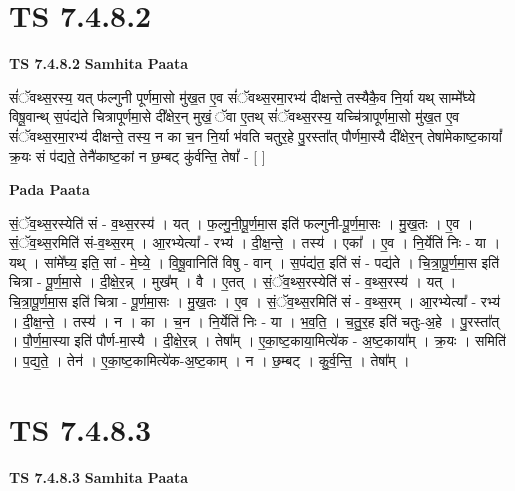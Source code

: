 \documentclass[17pt]{extarticle}
\begin{document}
\section*{ TS 7.4.8.2 }

\textbf{TS 7.4.8.2 } \newline
\textbf{Samhita Paata} \newline

सं॑ॅवथ्स॒रस्य॒ यत् फ॑ल्गुनी पूर्णमा॒सो मु॑ख॒त ए॒व सं॑ॅवथ्स॒रमा॒रभ्य॑ दीक्षन्ते॒ तस्यैकै॒व नि॒र्या यथ् साम्मे᳚घ्ये विषू॒वान्थ् स॒पंद्य॑ते चित्रापूर्णमा॒से दी᳚क्षेर॒न् मुखं॒ ॅवा ए॒तथ् सं॑ॅवथ्स॒रस्य॒ यच्चि॑त्रापूर्णमा॒सो मु॑ख॒त ए॒व सं॑ॅवथ्स॒रमा॒रभ्य॑ दीक्षन्ते॒ तस्य॒ न का च॒न नि॒र्या भ॑वति चतुर॒हे पु॒रस्ता᳚त् पौर्णमा॒स्यै दी᳚क्षेर॒न् तेषा॑मेकाष्ट॒कायां᳚ क्र॒यः सं प॑द्यते॒ तेनै॑काष्ट॒कां न छ॒म्बट् कु॑र्वन्ति॒ तेषां᳚ - [  ] \newline

\textbf{Pada Paata} \newline

सं॒ॅव॒थ्स॒रस्येति॑ सं - व॒थ्स॒रस्य॑ । यत् । फ॒ल्गु॒नी॒पू॒र्ण॒मा॒स इति॑ फल्गुनी-पू॒र्ण॒मा॒सः । मु॒ख॒तः । ए॒व । सं॒ॅव॒थ्स॒रमिति॑ सं-व॒थ्स॒रम् । आ॒रभ्येत्या᳚ - रभ्य॑ । दी॒क्ष॒न्ते॒ । तस्य॑ । एका᳚ । ए॒व । नि॒र्येति॑ निः - या । यथ् । सांमे᳚घ्य॒ इति॒ सां - मे॒घ्ये॒ । वि॒षू॒वानिति॑ विषु - वान् । स॒पंद्य॑त॒ इति॑ सं - पद्य॑ते । चि॒त्रा॒पू॒र्ण॒मा॒स इति॑ चित्रा - पू॒र्ण॒मा॒से । दी॒क्षे॒र॒न्न् । मुख᳚म् । वै । ए॒तत् । सं॒ॅव॒थ्स॒रस्येति॑ सं - व॒थ्स॒रस्य॑ । यत् । चि॒त्रा॒पू॒र्ण॒मा॒स इति॑ चित्रा - पू॒र्ण॒मा॒सः । मु॒ख॒तः । ए॒व । सं॒ॅव॒थ्स॒रमिति॑ सं - व॒थ्स॒रम् । आ॒रभ्येत्या᳚ - रभ्य॑ । दी॒क्ष॒न्ते॒ । तस्य॑ । न । का । च॒न । नि॒र्येति॑ निः - या । भ॒व॒ति॒ । च॒तु॒र॒ह इति॑ चतुः-अ॒हे । पु॒रस्ता᳚त् । पौ॒र्ण॒मा॒स्या इति॑ पौर्ण-मा॒स्यै । दी॒क्षे॒र॒न्न् । तेषा᳚म् । ए॒का॒ष्ट॒काया॒मित्ये॑क - अ॒ष्ट॒काया᳚म् । क्र॒यः । समिति॑ । प॒द्य॒ते॒ । तेन॑ । ए॒का॒ष्ट॒कामित्ये॑क-अ॒ष्ट॒काम् । न । छ॒म्बट् । कु॒र्व॒न्ति॒ । तेषा᳚म् ।  \newline




\section*{ TS 7.4.8.3 }

\textbf{TS 7.4.8.3 } \newline
\textbf{Samhita Paata} \newline
\end{document}
